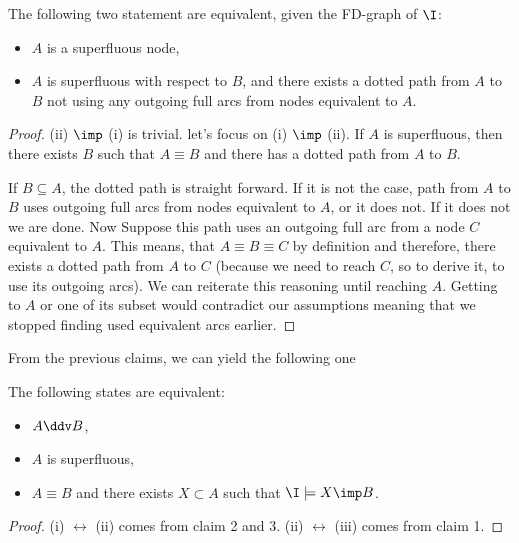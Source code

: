 \begin{claim} The following two statement are equivalent, given the FD-graph of
	$\I$:
	\begin{itemize}
		\item[(i)] $A$ is a superfluous node,
		\item[(ii)] $A$ is superfluous with respect to $B$, and there exists a
		dotted path from $A$ to $B$ not using any outgoing full arcs from nodes
		equivalent to $A$.
	\end{itemize}
	
\end{claim}

\begin{proof} (ii) $\imp$ (i) is trivial. let's focus on (i) $\imp$ (ii). If 
	$A$ is superfluous, then there exists $B$ such that $A \equiv B$ and there 
	has a dotted path from $A$ to $B$.
	
	\vspace{1.2em}
	
	If $B \subseteq A$, the dotted path is straight forward. If it is not the 
	case,
	path from $A$ to $B$ uses outgoing full arcs from nodes equivalent to $A$, 
	or
	it does not. If it does not we are done. Now Suppose this
	path uses an outgoing full arc from a node $C$ equivalent to $A$. This 
	means,
	that $A \equiv B \equiv C$ by definition and therefore, there exists a
	dotted path from $A$ to $C$ (because we need to reach $C$, so to derive it,
	to use its outgoing arcs). We can reiterate this reasoning until reaching 
	$A$.
	Getting to $A$ or one of its subset would contradict our assumptions 
	meaning 
	that we stopped finding used equivalent arcs earlier.
	
\end{proof}

From the previous claims, we can yield the following one

\begin{claim} The following states are equivalent:
	\begin{itemize}
		\item[(i)] $A \ddv B$,
		\item[(ii)] $A$ is superfluous,
		\item[(iii)] $A \equiv B$ and there exists $X \subset A$ such that $\I 
		\models X \imp B$.
	\end{itemize}
\end{claim}

\begin{proof} (i) $\longleftrightarrow$ (ii) comes from claim 2 and 3. 
	(ii) $\longleftrightarrow$ (iii) comes from claim 1.
	
\end{proof}

